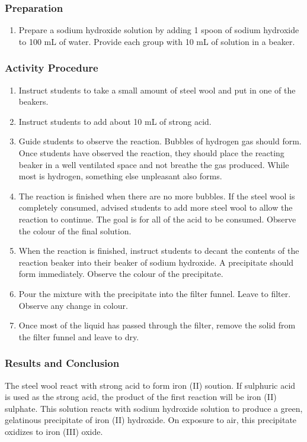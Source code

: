 \subsubsection*{Preparation}
\begin{enumerate}
\item{Prepare a sodium hydroxide solution by adding 1 spoon of sodium hydroxide to 100 mL of water. Provide each group with 10 mL of solution in a beaker.}
\end{enumerate}

\subsubsection*{Activity Procedure}
\begin{enumerate}
\item{Instruct students to take a small amount of steel wool and put in one of the beakers.}
\item{Instruct students to add about 10 mL of strong acid.}
\item{Guide students to observe the reaction. Bubbles of hydrogen gas should form. Once students have observed the reaction, they should place the reacting beaker in a well ventilated space and not breathe the gas produced. While most is hydrogen, something else unpleasant also forms.}
\item{The reaction is finished when there are no more bubbles. If the steel wool is completely consumed, advised students to add more steel wool to allow the reaction to continue. The goal is for all of the acid to be consumed. Observe the colour of the final solution.}
\item{When the reaction is finished, instruct students to decant the contents of the reaction beaker into their beaker of sodium hydroxide. A precipitate should form immediately. Observe the colour of the precipitate.}
\item{Pour the mixture with the precipitate into the filter funnel. Leave to filter. Observe any change in colour.}
\item{Once most of the liquid has passed through the filter, remove the solid from the filter funnel and leave to dry.}
\end{enumerate}

\subsubsection*{Results and Conclusion}
The steel wool react with strong acid to form iron (II) soution. If sulphuric acid is used as the strong acid, the product of the first reaction will be iron (II) sulphate. This solution reacts with sodium hydroxide solution to produce a green, gelatinous precipitate of iron (II) hydroxide. On exposure to air, this precipitate oxidizes to iron (III) oxide.

